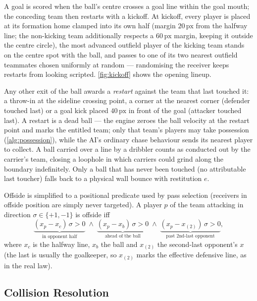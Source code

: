 \documentclass[10pt,twocolumn]{article}
\newcommand{\px}{\ensuremath{\,\mathrm{px}}}
\begin{document}
A goal is scored when the ball's centre crosses a goal line within the goal
mouth; the conceding team then restarts with a kickoff. At kickoff, every
player is placed at its formation home clamped into its own half (margin
$20\px$ from the halfway line; the non-kicking team additionally respects a
$60\px$ margin, keeping it outside the centre circle), the most advanced
outfield player of the kicking team stands on the centre spot with the
ball, and passes to one of its two nearest outfield teammates chosen
uniformly at random --- randomising the receiver keeps restarts from
looking scripted. \cref{fig:kickoff} shows the opening lineup.

Any other exit of the ball awards a \emph{restart} against the team that
last touched it: a throw-in at the sideline crossing point, a corner at the
nearest corner (defender touched last) or a goal kick placed $40\px$ in
front of the goal (attacker touched last). A restart is a dead ball --- the
engine zeroes the ball velocity at the restart point and marks the entitled
team; only that team's players may take possession
(\cref{alg:possession}), while the AI's ordinary chase behaviour sends its
nearest player to collect. A ball carried over a line by a dribbler counts
as conducted out by the carrier's team, closing a loophole in which
carriers could grind along the boundary indefinitely. Only a ball that has
never been touched (no attributable last toucher) falls back to a physical
wall bounce with restitution $e$.

Offside is simplified to a positional predicate used by pass selection
(receivers in offside position are simply never targeted). A player $p$ of
the team attacking in direction $\sigma \in \{+1,-1\}$ is offside iff
\begin{equation}\label{eq:offside}
\underbrace{(x_p - x_c)\,\sigma > 0}_{\text{in opponent half}}
\;\wedge\;
\underbrace{(x_p - x_b)\,\sigma > 0}_{\text{ahead of the ball}}
\;\wedge\;
\underbrace{(x_p - x_{(2)})\,\sigma > 0}_{\text{past 2nd-last opponent}},
\end{equation}
where $x_c$ is the halfway line, $x_b$ the ball and $x_{(2)}$ the
second-last opponent's $x$ (the last is usually the goalkeeper, so
$x_{(2)}$ marks the effective defensive line, as in the real law).

\subsection{Collision Resolution}\label{sec:separation}
\end{document}
